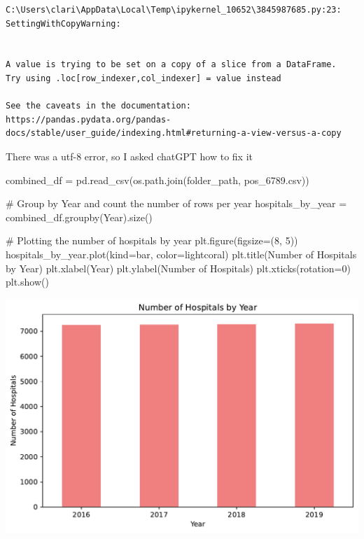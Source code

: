 \documentclass[
  letterpaper,
  DIV=11,
  numbers=noendperiod]{scrartcl}
\newenvironment{Shaded}{\begin{snugshade}}{\end{snugshade}}
\newcommand{\CommentTok}[1]{\textcolor[rgb]{0.37,0.37,0.37}{#1}}
\newcommand{\DecValTok}[1]{\textcolor[rgb]{0.68,0.00,0.00}{#1}}
\newcommand{\NormalTok}[1]{\textcolor[rgb]{0.00,0.23,0.31}{#1}}
\newcommand{\OperatorTok}[1]{\textcolor[rgb]{0.37,0.37,0.37}{#1}}
\newcommand{\StringTok}[1]{\textcolor[rgb]{0.13,0.47,0.30}{#1}}
\begin{document}
\begin{verbatim}
C:\Users\clari\AppData\Local\Temp\ipykernel_10652\3845987685.py:23: SettingWithCopyWarning:


A value is trying to be set on a copy of a slice from a DataFrame.
Try using .loc[row_indexer,col_indexer] = value instead

See the caveats in the documentation: https://pandas.pydata.org/pandas-docs/stable/user_guide/indexing.html#returning-a-view-versus-a-copy
\end{verbatim}

There was a utf-8 error, so I asked chatGPT how to fix it

\begin{Shaded}
\begin{Highlighting}[]
\NormalTok{combined\_df }\OperatorTok{=}\NormalTok{ pd.read\_csv(os.path.join(folder\_path, }\StringTok{\textquotesingle{}pos\_6789.csv\textquotesingle{}}\NormalTok{))}

\CommentTok{\# Group by \textquotesingle{}Year\textquotesingle{} and count the number of rows per year}
\NormalTok{hospitals\_by\_year }\OperatorTok{=}\NormalTok{ combined\_df.groupby(}\StringTok{\textquotesingle{}Year\textquotesingle{}}\NormalTok{).size()}

\CommentTok{\# Plotting the number of hospitals by year}
\NormalTok{plt.figure(figsize}\OperatorTok{=}\NormalTok{(}\DecValTok{8}\NormalTok{, }\DecValTok{5}\NormalTok{))}
\NormalTok{hospitals\_by\_year.plot(kind}\OperatorTok{=}\StringTok{\textquotesingle{}bar\textquotesingle{}}\NormalTok{, color}\OperatorTok{=}\StringTok{\textquotesingle{}lightcoral\textquotesingle{}}\NormalTok{)}
\NormalTok{plt.title(}\StringTok{\textquotesingle{}Number of Hospitals by Year\textquotesingle{}}\NormalTok{)}
\NormalTok{plt.xlabel(}\StringTok{\textquotesingle{}Year\textquotesingle{}}\NormalTok{)}
\NormalTok{plt.ylabel(}\StringTok{\textquotesingle{}Number of Hospitals\textquotesingle{}}\NormalTok{)}
\NormalTok{plt.xticks(rotation}\OperatorTok{=}\DecValTok{0}\NormalTok{)}
\NormalTok{plt.show()}
\end{Highlighting}
\end{Shaded}

\includegraphics{pset4_submission_files/figure-pdf/cell-6-output-1.pdf}
\end{document}

